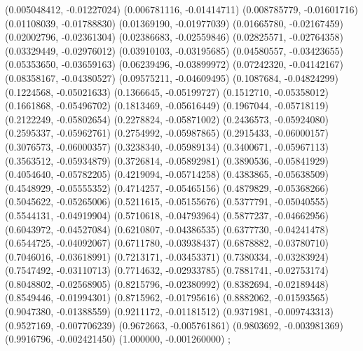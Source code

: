 {\begin{scope}[#1]
{    (0.005048412, -0.01227024)
    (0.006781116, -0.01414711)
    (0.008785779, -0.01601716)
    (0.01108039, -0.01788830)
    (0.01369190, -0.01977039)
    (0.01665780, -0.02167459)
    (0.02002796, -0.02361304)
    (0.02386683, -0.02559846)
    (0.02825571, -0.02764358)
    (0.03329449, -0.02976012)
    (0.03910103, -0.03195685)
    (0.04580557, -0.03423655)
    (0.05353650, -0.03659163)
    (0.06239496, -0.03899972)
    (0.07242320, -0.04142167)
    (0.08358167, -0.04380527)
    (0.09575211, -0.04609495)
    (0.1087684, -0.04824299)
    (0.1224568, -0.05021633)
    (0.1366645, -0.05199727)
    (0.1512710, -0.05358012)
    (0.1661868, -0.05496702)
    (0.1813469, -0.05616449)
    (0.1967044, -0.05718119)
    (0.2122249, -0.05802654)
    (0.2278824, -0.05871002)
    (0.2436573, -0.05924080)
    (0.2595337, -0.05962761)
    (0.2754992, -0.05987865)
    (0.2915433, -0.06000157)
    (0.3076573, -0.06000357)
    (0.3238340, -0.05989134)
    (0.3400671, -0.05967113)
    (0.3563512, -0.05934879)
    (0.3726814, -0.05892981)
    (0.3890536, -0.05841929)
    (0.4054640, -0.05782205)
    (0.4219094, -0.05714258)
    (0.4383865, -0.05638509)
    (0.4548929, -0.05555352)
    (0.4714257, -0.05465156)
    (0.4879829, -0.05368266)
    (0.5045622, -0.05265006)
    (0.5211615, -0.05155676)
    (0.5377791, -0.05040555)
    (0.5544131, -0.04919904)
    (0.5710618, -0.04793964)
    (0.5877237, -0.04662956)
    (0.6043972, -0.04527084)
    (0.6210807, -0.04386535)
    (0.6377730, -0.04241478)
    (0.6544725, -0.04092067)
    (0.6711780, -0.03938437)
    (0.6878882, -0.03780710)
    (0.7046016, -0.03618991)
    (0.7213171, -0.03453371)
    (0.7380334, -0.03283924)
    (0.7547492, -0.03110713)
    (0.7714632, -0.02933785)
    (0.7881741, -0.02753174)
    (0.8048802, -0.02568905)
    (0.8215796, -0.02380992)
    (0.8382694, -0.02189448)
    (0.8549446, -0.01994301)
    (0.8715962, -0.01795616)
    (0.8882062, -0.01593565)
    (0.9047380, -0.01388559)
    (0.9211172, -0.01181512)
    (0.9371981, -0.009743313)
    (0.9527169, -0.007706239)
    (0.9672663, -0.005761861)
    (0.9803692, -0.003981369)
    (0.9916796, -0.002421450)
    (1.000000, -0.001260000)
  };
\end{scope}
}

